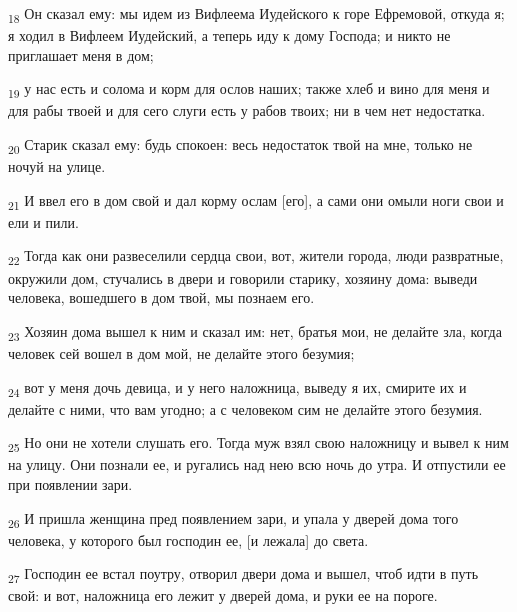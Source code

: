 \begin{tcolorbox}
\textsubscript{18} Он сказал ему: мы идем из Вифлеема Иудейского к горе Ефремовой, откуда я; я ходил в Вифлеем Иудейский, а теперь иду к дому Господа; и никто не приглашает меня в дом;
\end{tcolorbox}
\begin{tcolorbox}
\textsubscript{19} у нас есть и солома и корм для ослов наших; также хлеб и вино для меня и для рабы твоей и для сего слуги есть у рабов твоих; ни в чем нет недостатка.
\end{tcolorbox}
\begin{tcolorbox}
\textsubscript{20} Старик сказал ему: будь спокоен: весь недостаток твой на мне, только не ночуй на улице.
\end{tcolorbox}
\begin{tcolorbox}
\textsubscript{21} И ввел его в дом свой и дал корму ослам [его], а сами они омыли ноги свои и ели и пили.
\end{tcolorbox}
\begin{tcolorbox}
\textsubscript{22} Тогда как они развеселили сердца свои, вот, жители города, люди развратные, окружили дом, стучались в двери и говорили старику, хозяину дома: выведи человека, вошедшего в дом твой, мы познаем его.
\end{tcolorbox}
\begin{tcolorbox}
\textsubscript{23} Хозяин дома вышел к ним и сказал им: нет, братья мои, не делайте зла, когда человек сей вошел в дом мой, не делайте этого безумия;
\end{tcolorbox}
\begin{tcolorbox}
\textsubscript{24} вот у меня дочь девица, и у него наложница, выведу я их, смирите их и делайте с ними, что вам угодно; а с человеком сим не делайте этого безумия.
\end{tcolorbox}
\begin{tcolorbox}
\textsubscript{25} Но они не хотели слушать его. Тогда муж взял свою наложницу и вывел к ним на улицу. Они познали ее, и ругались над нею всю ночь до утра. И отпустили ее при появлении зари.
\end{tcolorbox}
\begin{tcolorbox}
\textsubscript{26} И пришла женщина пред появлением зари, и упала у дверей дома того человека, у которого был господин ее, [и лежала] до света.
\end{tcolorbox}
\begin{tcolorbox}
\textsubscript{27} Господин ее встал поутру, отворил двери дома и вышел, чтоб идти в путь свой: и вот, наложница его лежит у дверей дома, и руки ее на пороге.
\end{tcolorbox}
